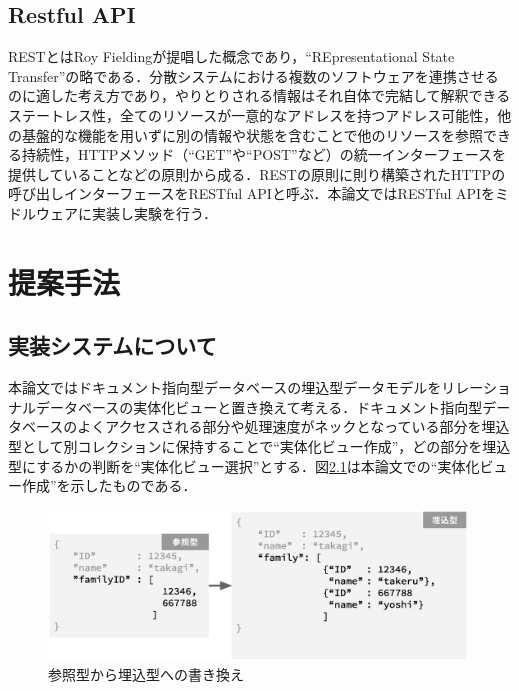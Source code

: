 \documentclass[a4paper,11pt]{ujreport}
\begin{document}
\section{Restful API}
RESTとはRoy Fieldingが提唱した概念であり\cite{fielding2000architectural}，“REpresentational State Transfer”の略である．分散システムにおける複数のソフトウェアを連携させるのに適した考え方であり，やりとりされる情報はそれ自体で完結して解釈できるステートレス性，全てのリソースが一意的なアドレスを持つアドレス可能性，他の基盤的な機能を用いずに別の情報や状態を含むことで他のリソースを参照できる持続性，HTTPメソッド（“GET”や“POST”など）の統一インターフェースを提供していることなどの原則から成る．RESTの原則に則り構築されたHTTPの呼び出しインターフェースをRESTful APIと呼ぶ．本論文ではRESTful APIをミドルウェアに実装し実験を行う．

\chapter{提案手法}
\section{実装システムについて}
本論文ではドキュメント指向型データベースの埋込型データモデルをリレーショナルデータベースの実体化ビューと置き換えて考える．ドキュメント指向型データベースのよくアクセスされる部分や処理速度がネックとなっている部分を埋込型として別コレクションに保持することで“実体化ビュー作成”，どの部分を埋込型にするかの判断を“実体化ビュー選択”とする．図\ref{ReferenceToEmbed}は本論文での“実体化ビュー作成”を示したものである．
\begin{figure}[htbp]
	\begin{center}
		\includegraphics[width=30em, trim=0 13em 0 0]{src/ReferenceToEmbed.eps} %
	\end{center}
	\caption{参照型から埋込型への書き換え}
	\label{ReferenceToEmbed}
\end{figure}
\end{document}
